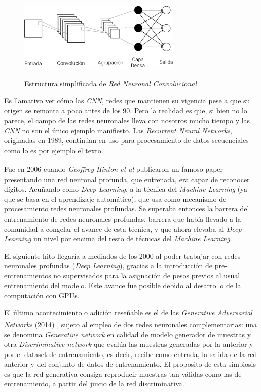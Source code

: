 \begin{figure}[h]
    \centering
    \includegraphics[width=0.69\textwidth]{capturas/CNN.png}\\[-0,20cm]
    \caption{Estructura simplificada de \textit{Red Neuronal Convolucional}\label{cnn}}
\end{figure}

Es llamativo ver cómo las \textit{CNN}, redes que mantienen su vigencia
pese a que su origen se remonta a poco antes de los 90. Pero la realidad es
que, si bien no lo parece, el campo de las redes neuronales lleva con nosotros
mucho tiempo y las \textit{CNN} no son el único ejemplo manifiesto.
Las \textit{Recurrent Neural Networks}, originadas en 1989, continúan en
uso para procesamiento de datos secuenciales como lo es por ejemplo el texto.

Fue en 2006 cuando \textit{Geoffrey Hinton et al} publicaron un famoso
paper\textsuperscript{\cite{hinton}} presentando una red neuronal profunda,
que entrenada, era capaz de reconocer dígitos. Acuñando como \textit{Deep Learning},
a la técnica del \textit{Machine Learning} (ya que se basa en el aprendizaje
automático), que usa como mecanismo de procesamiento redes neuronales profundas.
Se superaba entonces la barrera del entrenamiento de redes neuronales profundas,
barrera que había llevado a la comunidad a congelar el avance de esta técnica,
y que ahora elevaba al \textit{Deep Learning}
un nivel por encima del resto de técnicas del \textit{Machine Learning}.

El siguiente hito llegaría a mediados de los 2000 al poder trabajar
con redes neuronales profundas (\textit{Deep Learning}), gracias a la
introducción de pre-entrenamientos no supervisados para la asignación
de pesos previos al usual entrenamiento del modelo. Este avance fue
posible debido al desarrollo de la computación con GPUs.


El último acontecimiento o adición reseñable es el de las
\textit{Generative Adversarial Networks} (2014)
\textsuperscript{\cite{genAd}}, sujeto al empleo de dos
redes neuronales complementarias: una se denomina \textit{Generative network}
en calidad de modelo generador de muestras y otra \textit{Discriminative network}
que evalúa las muestras generadas por la anterior y por el dataset de entrenamiento,
es decir, recibe como entrada, la salida de la red anterior y del conjunto
de datos de entrenamiento. El proposito de esta simbiosis es que la red
generativa consiga reproducir muestras tan válidas como las de entrenamiento,
a partir del juicio de la red discriminativa.


